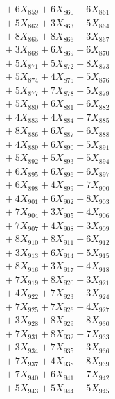 \documentclass[a4paper,10pt]{article}
\begin{document}
{\begin{align}
&\;  + 6 X_{859} + 6 X_{860} + 6 X_{861} \\[0.3ex]
&\;  + 5 X_{862} + 3 X_{863} + 5 X_{864} \\[0.3ex]
&\;  + 8 X_{865} + 8 X_{866} + 3 X_{867} \\[0.3ex]
&\;  + 3 X_{868} + 6 X_{869} + 6 X_{870} \\[0.3ex]
&\;  + 5 X_{871} + 5 X_{872} + 8 X_{873} \\[0.3ex]
&\;  + 5 X_{874} + 4 X_{875} + 5 X_{876} \\[0.3ex]
&\;  + 5 X_{877} + 7 X_{878} + 5 X_{879} \\[0.5ex]\allowbreak
&\;  + 5 X_{880} + 6 X_{881} + 6 X_{882} \\[0.3ex]
&\;  + 4 X_{883} + 4 X_{884} + 7 X_{885} \\[0.3ex]
&\;  + 8 X_{886} + 6 X_{887} + 6 X_{888} \\[0.3ex]
&\;  + 4 X_{889} + 6 X_{890} + 5 X_{891} \\[0.3ex]
&\;  + 5 X_{892} + 5 X_{893} + 5 X_{894} \\[0.3ex]
&\;  + 6 X_{895} + 6 X_{896} + 6 X_{897} \\[0.3ex]
&\;  + 6 X_{898} + 4 X_{899} + 7 X_{900} \\[0.3ex]
&\;  + 4 X_{901} + 6 X_{902} + 8 X_{903} \\[0.3ex]
&\;  + 7 X_{904} + 3 X_{905} + 4 X_{906} \\[0.3ex]
&\;  + 7 X_{907} + 4 X_{908} + 3 X_{909} \\[0.5ex]\allowbreak
&\;  + 8 X_{910} + 8 X_{911} + 6 X_{912} \\[0.3ex]
&\;  + 3 X_{913} + 6 X_{914} + 5 X_{915} \\[0.3ex]
&\;  + 8 X_{916} + 3 X_{917} + 4 X_{918} \\[0.3ex]
&\;  + 7 X_{919} + 8 X_{920} + 3 X_{921} \\[0.3ex]
&\;  + 4 X_{922} + 7 X_{923} + 3 X_{924} \\[0.3ex]
&\;  + 7 X_{925} + 7 X_{926} + 4 X_{927} \\[0.3ex]
&\;  + 3 X_{928} + 8 X_{929} + 8 X_{930} \\[0.3ex]
&\;  + 7 X_{931} + 8 X_{932} + 7 X_{933} \\[0.3ex]
&\;  + 3 X_{934} + 7 X_{935} + 3 X_{936} \\[0.3ex]
&\;  + 7 X_{937} + 4 X_{938} + 8 X_{939} \\[0.5ex]\allowbreak
&\;  + 7 X_{940} + 6 X_{941} + 7 X_{942} \\[0.3ex]
&\;  + 5 X_{943} + 5 X_{944} + 5 X_{945} \\[0.3ex]

\end{align}}
\end{document}
